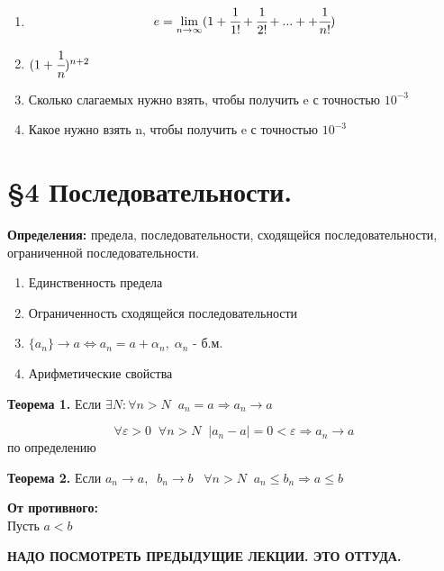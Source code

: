 \documentclass[12pt, paper]{article}
\begin{document}
\begin{tcolorbox}[title=Доказать/подумать]
    \begin{enumerate}
        \item \[ e = \lim_{n\to\infty} (1+\cfrac{1}{1!} +\cfrac{1}{2!} + ... + +\cfrac{1}{n!}) \]
        \item $(1+\cfrac{1}{n})^{n+2}$
        \item Сколько слагаемых нужно взять, чтобы получить e с точностью $10^{-3}$\\
        \item Какое нужно взять n, чтобы получить e с точностью $10^{-3}$
    \end{enumerate}
\end{tcolorbox}

\section{\S4 Последовательности.}
\begin{tcolorbox}
    \textbf{Определения:} предела, последовательности, сходящейся последовательности, ограниченной последовательности.
\end{tcolorbox}

\begin{tcolorbox}[title=Теоремы ]
    \begin{enumerate}
        \item Единственность предела
        \item Ограниченность сходящейся последовательности
        \item $\{a_n\} \to a \Leftrightarrow a_n = a + \alpha_n,\; \alpha_n$ - б.м.
        \item Арифметические свойства
    \end{enumerate}
\end{tcolorbox}

\begin{tcolorbox}
    \textbf{Теорема 1.} Если $\exists N: \forall n > N \;\; a_n = a \Rightarrow a_n\to a$
\end{tcolorbox}
\begin{tcolorbox}[title=Доказательство]
    \[ \forall \varepsilon>0 \;\;\forall n>N \;\; |a_n - a| = 0 < \varepsilon \Rightarrow a_n\to a\] по определению 
\end{tcolorbox}

\begin{tcolorbox}
    \textbf{Теорема 2.} Если $ a_n\to a,\;\; b_n\to b \;\;\;\forall n > N \;\; a_n \leq b_n \Rightarrow a\leq b $
\end{tcolorbox}
\begin{tcolorbox}[title=Доказательство]
    \textbf{От противного:}\\ 
    Пусть $ a < b$
\end{tcolorbox}
\textbf{НАДО ПОСМОТРЕТЬ ПРЕДЫДУЩИЕ ЛЕКЦИИ. ЭТО ОТТУДА.}
\end{document}
